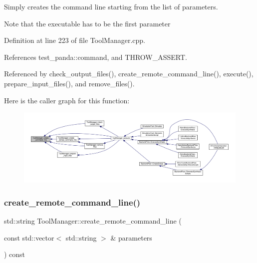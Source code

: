 Simply creates the command line starting from the list of parameters. 

Note that the executable has to be the first parameter 

Definition at line 223 of file Tool\+Manager.\+cpp.



References test\+\_\+panda\+::command, and T\+H\+R\+O\+W\+\_\+\+A\+S\+S\+E\+RT.



Referenced by check\+\_\+output\+\_\+files(), create\+\_\+remote\+\_\+command\+\_\+line(), execute(), prepare\+\_\+input\+\_\+files(), and remove\+\_\+files().

Here is the caller graph for this function\+:
\nopagebreak
\begin{figure}[H]
\begin{center}
\leavevmode
\includegraphics[width=350pt]{dc/dc5/classToolManager_aafcbbb6648d720ac19b5201626f1315a_icgraph}
\end{center}
\end{figure}
\mbox{\label{classToolManager_aaa21b7a46e2bc7c2d0842107224f54b4}} 
\subsubsection{\texorpdfstring{create\+\_\+remote\+\_\+command\+\_\+line()}{create\_remote\_command\_line()}}
{\footnotesize\ttfamily std\+::string Tool\+Manager\+::create\+\_\+remote\+\_\+command\+\_\+line (\begin{DoxyParamCaption}\item[{const std\+::vector$<$ std\+::string $>$ \&}]{parameters }\end{DoxyParamCaption}) const\hspace{0.3cm}{\ttfamily [protected]}}



